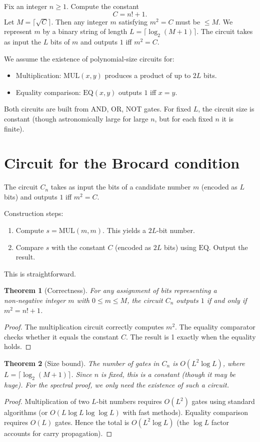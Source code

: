 \documentclass[11pt,a4paper]{article}
\newtheorem{theorem}{Theorem}[section]
\begin{document}
Fix an integer $n\ge 1$. Compute the constant
\[
C = n! + 1.
\]
Let $M = \lceil \sqrt{C} \rceil$. Then any integer $m$ satisfying $m^2 = C$ must be $\le M$. We represent $m$ by a binary string of length $L = \lceil \log_2(M+1)\rceil$. The circuit takes as input the $L$ bits of $m$ and outputs $1$ iff $m^2 = C$.

We assume the existence of polynomial‑size circuits for:
\begin{itemize}
\item Multiplication: $\mathrm{MUL}(x,y)$ produces a product of up to $2L$ bits.
\item Equality comparison: $\mathrm{EQ}(x,y)$ outputs $1$ iff $x=y$.
\end{itemize}
Both circuits are built from AND, OR, NOT gates. For fixed $L$, the circuit size is constant (though astronomically large for large $n$, but for each fixed $n$ it is finite).

\section{Circuit for the Brocard condition}

The circuit $C_n$ takes as input the bits of a candidate number $m$ (encoded as $L$ bits) and outputs $1$ iff $m^2 = C$.

Construction steps:
\begin{enumerate}
\item Compute $s = \mathrm{MUL}(m, m)$. This yields a $2L$-bit number.
\item Compare $s$ with the constant $C$ (encoded as $2L$ bits) using $\mathrm{EQ}$. Output the result.
\end{enumerate}
This is straightforward.

\begin{theorem}[Correctness]
\label{thm:correct}
For any assignment of bits representing a non‑negative integer $m$ with $0\le m\le M$, the circuit $C_n$ outputs $1$ if and only if $m^2 = n! + 1$.
\end{theorem}
\begin{proof}
The multiplication circuit correctly computes $m^2$. The equality comparator checks whether it equals the constant $C$. The result is 1 exactly when the equality holds.
\end{proof}

\begin{theorem}[Size bound]
\label{thm:size}
The number of gates in $C_n$ is $O(L^2 \log L)$, where $L = \lceil \log_2(M+1)\rceil$. Since $n$ is fixed, this is a constant (though it may be huge). For the spectral proof, we only need the existence of such a circuit.
\end{theorem}
\begin{proof}
Multiplication of two $L$-bit numbers requires $O(L^2)$ gates using standard algorithms (or $O(L \log L \log \log L)$ with fast methods). Equality comparison requires $O(L)$ gates. Hence the total is $O(L^2 \log L)$ (the $\log L$ factor accounts for carry propagation).
\end{proof}
\end{document}
